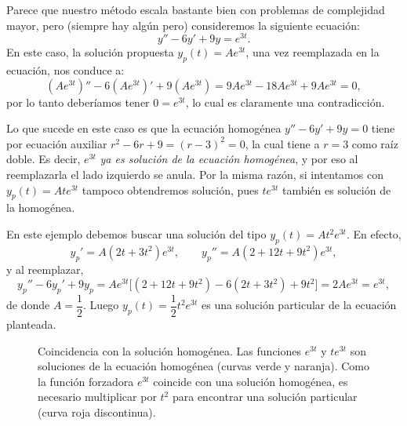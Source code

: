 Parece que nuestro m\'etodo escala bastante bien con problemas de complejidad mayor, pero (siempre hay alg\'un pero) consideremos la siguiente ecuaci\'on:
\[
y''-6y'+9y=e^{3t}.
\]
En este caso, la soluci\'on propuesta $y_p(t)=Ae^{3t}$, una vez reemplazada en la ecuaci\'on, nos conduce a:
\[
(Ae^{3t})''-6(Ae^{3t})'+9(Ae^{3t})=9Ae^{3t}-18Ae^{3t}+9Ae^{3t}=0,
\]
por lo tanto deber\'iamos tener $0=e^{3t}$, lo cual es claramente una contradicci\'on.

Lo que sucede en este caso es que la ecuaci\'on homog\'enea $y''-6y'+9y=0$ tiene por ecuaci\'on auxiliar $r^2-6r+9=(r-3)^2=0$, la cual tiene a $r=3$ como ra\'iz doble. Es decir, $e^{3t}$ \emph{ya es soluci\'on de la ecuaci\'on homog\'enea}, y por eso al reemplazarla el lado izquierdo se anula. Por la misma raz\'on, si intentamos con $y_p(t)=Ate^{3t}$ tampoco obtendremos soluci\'on, pues $te^{3t}$ tambi\'en es soluci\'on de la homog\'enea.

En este ejemplo debemos buscar una soluci\'on del tipo $y_p(t)=At^2e^{3t}$. En efecto,
\[
y_p'=A(2t+3t^2)e^{3t},\qquad y_p''=A(2+12t+9t^2)e^{3t},
\]
y al reemplazar,
\[
y_p''-6y_p'+9y_p=Ae^{3t}\big[(2+12t+9t^2)-6(2t+3t^2)+9t^2\big]=2Ae^{3t}=e^{3t},
\]
de donde $A=\dfrac{1}{2}$. Luego $y_p(t)=\dfrac{1}{2}t^2e^{3t}$ es una soluci\'on particular de la ecuaci\'on planteada.

\begin{figure}[h!]
    \centering
    \caption{Coincidencia con la soluci\'on homog\'enea. Las funciones $e^{3t}$ y $te^{3t}$ son soluciones de la ecuaci\'on homog\'enea (curvas verde y naranja). Como la funci\'on forzadora $e^{3t}$ coincide con una soluci\'on homog\'enea, es necesario multiplicar por $t^2$ para encontrar una soluci\'on particular (curva roja discontinua).}
    \label{fig:coincidencia}
\end{figure}

